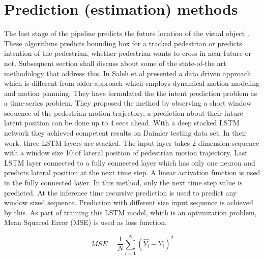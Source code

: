 \section{Prediction (estimation) methods }
The last stage of the pipeline predicts the future location of the visual object \cite{saleh2017intent, zhang2019sr, xue2018ss, lipton2015critical}. These algorithms predicts  bounding box for a tracked pedestrian or predicts intention of the pedestrian, whether pedestrian wants to cross in near future or not. Subsequent section shall discuss about some of the state-of-the art methodology that address this.
In \cite{saleh2017intent} Saleh et.al presented a data driven approach which is different from older approach which employs dynamical motion modeling and motion planning. They have formulated the the intent prediction problem as a time-series problem. They proposed the method by observing a short window sequence of the pedestrian motion trajectory, a prediction about their future latent position can be done up to 4 secs ahead. With a deep stacked LSTM network they achieved competent results on Daimler testing data set. In their work, three LSTM layers are stacked. The input layer takes 2-dimension sequence with a window size 10 of lateral position of pedestrian motion trajectory. Last LSTM layer connected to a fully connected layer which has only one neuron and predicts lateral position at the next time step. A linear activation function is used in the fully connected layer. In this method, only the next time step value is predicted. At the inference time recursive prediction is used to predict any window sized sequence. Prediction with different size input sequence is achieved by this.
As part of training this LSTM  model, which is an optimization problem, Mean Squared Error (MSE) is used as loss function.

\begin{equation}
MSE= \frac{1}{N}\sum_{i=1}^{N}(\hat{Y_i} - Y_i)^2
\end{equation}

